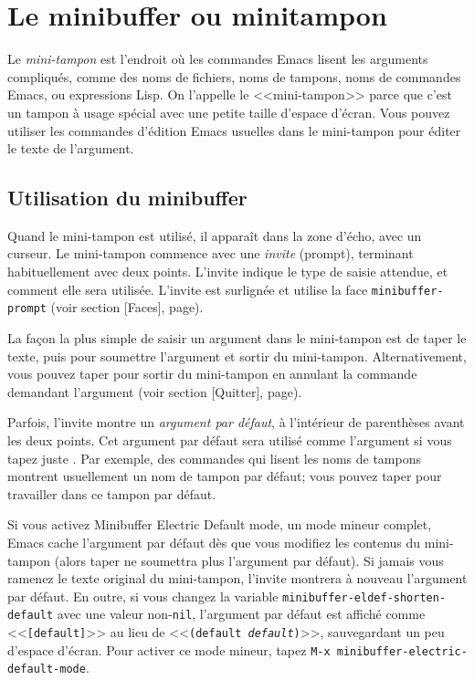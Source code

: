\chapter{Le minibuffer ou minitampon}

Le \emph{mini-tampon} est l'endroit où les commandes Emacs lisent les
arguments compliqués, comme des noms de fichiers, noms de tampons,
noms de commandes Emacs, ou expressions Lisp. On l'appelle le
<<mini-tampon>> parce que c'est un tampon à usage spécial avec une
petite taille d'espace d'écran. Vous pouvez utiliser les commandes
d'édition Emacs usuelles dans le mini-tampon pour éditer le texte de
l'argument.\par 

\section{Utilisation du minibuffer}
Quand le mini-tampon est utilisé, il apparaît dans la zone d'écho,
avec un curseur. Le mini-tampon commence avec une \emph{invite}
(prompt), terminant habituellement avec deux points. L'invite indique
le type de saisie attendue, et comment elle sera utilisée. L'invite
est surlignée et utilise la face \texttt{minibuffer-prompt} (voir
section [Faces], page).\par

La façon la plus simple de saisir un argument dans le mini-tampon est
de taper le texte, puis \RET pour soumettre l'argument et
sortir du mini-tampon. Alternativement, vous pouvez taper 
pour sortir du mini-tampon en annulant la commande demandant
l'argument (voir section [Quitter],
page).\par

Parfois, l'invite montre un \emph{argument par défaut}, à l'intérieur
de parenthèses avant les deux points. Cet argument par défaut sera
utilisé comme l'argument si vous tapez juste \RET. Par
exemple, des commandes qui lisent les noms de tampons montrent
usuellement un nom de tampon par défaut; vous pouvez taper
\RET pour travailler dans ce tampon par défaut.\par

Si vous activez Minibuffer Electric Default mode, un mode mineur
complet, Emacs cache l'argument par défaut dès que vous modifiez les
contenus du mini-tampon (alors taper \RET ne soumettra plus
l'argument par défaut). Si jamais vous ramenez le texte original du
mini-tampon, l'invite montrera à nouveau l'argument par défaut. En
outre, si vous changez la variable
\texttt{minibuffer-eldef-shorten-default} avec une valeur
non-\texttt{nil}, l'argument par défaut est affiché comme
<<\texttt{[default]}>> au lieu de <<\texttt{(default
  \emph{default})}>>, sauvegardant un peu d'espace d'écran. Pour
  activer ce mode mineur, tapez \texttt{M-x
    minibuffer-electric-default-mode}.\par 

